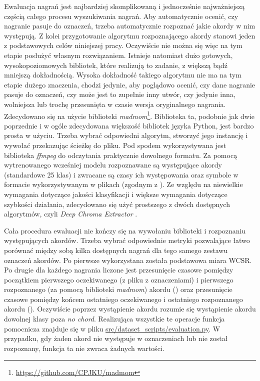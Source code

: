 Ewaluacja nagrań jest najbardziej skomplikowaną i jednocześnie najważniejszą częścią całego procesu wyszukiwania nagrań. Aby automatycznie ocenić, czy nagranie pasuje do oznaczeń, trzeba automatycznie rozpoznać jakie akordy w nim występują. Z kolei przygotowanie algorytmu rozpoznającego akordy stanowi jeden z podstawowych celów niniejszej pracy. Oczywiście nie można się więc na tym etapie posłużyć własnym rozwiązaniem. Istnieje natomiast dużo gotowych, wysokopoziomowych bibliotek, które realizują to zadanie, z większą bądź mniejszą dokładnością. Wysoka dokładność takiego algorytmu nie ma na tym etapie dużego znaczenia, chodzi jedynie, aby poglądowo ocenić, czy dane nagranie pasuje do oznaczeń, czy może jest to zupełnie inny utwór, czy jedynie inna, wolniejsza lub trochę przesunięta w czasie wersja oryginalnego nagrania. Zdecydowano się na użycie biblioteki \emph{madmom}\footnote{\url{https://github.com/CPJKU/madmom}}.  Biblioteka ta, podobnie jak dwie poprzednie i w ogóle zdecydowana większość bibliotek języka Python, jest bardzo prosta w użyciu. Trzeba wybrać odpowiedni algorytm, stworzyć jego instancję i wywołać przekazując ścieżkę do pliku. Pod spodem wykorzystywana jest biblioteka \emph{ffmpeg} do odczytania praktycznie dowolnego formatu. Za pomocą wytrenowanego wcześniej modelu rozpoznawane są występujące akordy (standardowe 25 klas) i zwracane są czasy ich występowania oraz symbole w formacie wykorzystywanym w plikach  (zgodnym z \cite{harte_towards_nodate}). Ze względu na niewielkie wymagania dotyczące jakości klasyfikacji i większe wymagania dotyczące szybkości działania, zdecydowano się użyć prostszego z dwóch dostępnych algorytmów, czyli \emph{Deep Chroma Extractor} \cite{korzeniowski_feature_2016}.

Cała procedura ewaluacji nie kończy się na wywołaniu biblioteki i rozpoznaniu występujących akordów.  Trzeba wybrać odpowiednie metryki pozwalające łatwo porównać między sobą kilka dostępnych nagrań dla tego samego zestawu oznaczeń akordów. Po pierwsze wykorzystana została podstawowa miara WCSR. Po drugie dla każdego nagrania liczone jest przesunięcie czasowe pomiędzy początkiem pierwszego oczekiwanego (z pliku z oznaczeniami) i pierwszego rozpoznanego (za pomocą biblioteki \emph{madmom}) akordu () oraz przesunięcie czasowe pomiędzy końcem ostatniego oczekiwanego i ostatniego rozpoznanego akordu (). Oczywiście poprzez wystąpienie akordu rozumie się wystąpienie akordu dowolnej klasy poza \emph{no chord}. Realizująca wszystkie te operacje funkcja pomocnicza znajduje się w pliku \url{src/dataset_scripts/evaluation.py}. W przypadku, gdy żaden akord nie występuje w oznaczeniach lub nie został rozpoznany, funkcja ta nie zwraca żadnych wartości.

